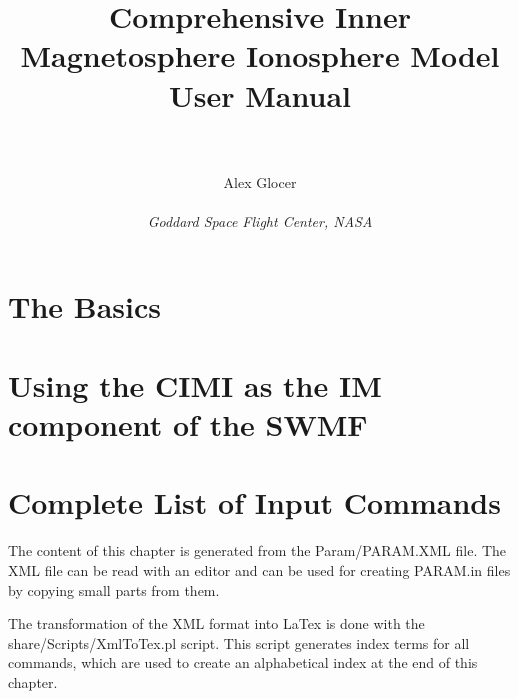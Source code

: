 \documentclass[twoside,10pt]{book}
\title{Comprehensive Inner Magnetosphere Ionosphere Model User Manual \\ 
       \hfill \\}
\author{Alex Glocer\\
       \hfill \\
       {\it Goddard Space Flight Center, NASA}}
\begin{document}


\chapter{The Basics \label{chapter:basics}}




\chapter{Using the CIMI as the IM component of the SWMF \label{SWMF}}


%

%


\chapter{Complete List of Input Commands \label{chapter:commands}}

The content of this chapter is generated from the Param/PARAM.XML file.
The XML file can be read with an editor and can be used
for creating PARAM.in files by copying small parts from them.

The transformation of the XML
format into LaTex is done with the share/Scripts/XmlToTex.pl
script. This script generates index terms for all commands,
which are used to create an alphabetical index at the end of this chapter.



\newpage
{}

\end{document}
